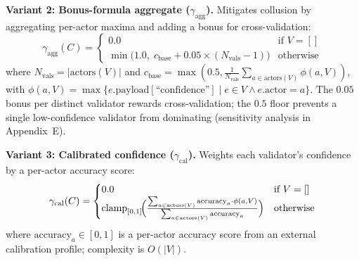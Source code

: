 \textbf{Variant 2: Bonus-formula aggregate ($\gamma_{\text{agg}}$).} Mitigates collusion by aggregating per-actor maxima and adding a bonus for cross-validation:
\begin{equation}\label{eq:gamma-agg}
    \gamma_{\text{agg}}(C) = \begin{cases}
        0.0 & \text{if } V = [] \\
        \min\!\bigl(1.0,\; c_{\text{base}} + 0.05 \times (N_{\text{vals}} - 1)\bigr) & \text{otherwise}
    \end{cases}
\end{equation}
where $N_{\text{vals}} = |\text{actors}(V)|$ and $c_{\text{base}} = \max(0.5, \frac{1}{N_{\text{vals}}} \sum_{a \in \text{actors}(V)} \phi(a, V))$, with $\phi(a, V) = \max\{e.\text{payload}[\text{``confidence''}] \mid e \in V \land e.\text{actor} = a\}$. The $0.05$ bonus per distinct validator rewards cross-validation; the $0.5$ floor prevents a single low-confidence validator from dominating (sensitivity analysis in Appendix~E).

\textbf{Variant 3: Calibrated confidence ($\gamma_{\text{cal}}$).} Weights each validator's confidence by a per-actor accuracy score:
\begin{equation}\label{eq:gamma-cal}
    \gamma_{\text{cal}}(C) = \begin{cases}
        0.0 & \text{if } V = [] \\
        \text{clamp}_{[0,1]}\!\Bigl(\frac{\sum_{a \in \text{actors}(V)} \text{accuracy}_a \cdot \phi(a, V)}{\sum_{a \in \text{actors}(V)} \text{accuracy}_a}\Bigr) & \text{otherwise}
    \end{cases}
\end{equation}
where $\text{accuracy}_a \in [0,1]$ is a per-actor accuracy score from an external calibration profile; complexity is $O(|V|)$.

